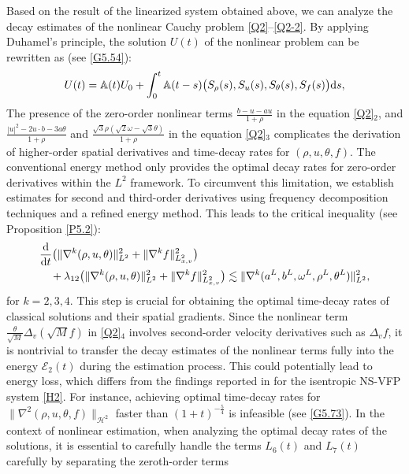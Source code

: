 \documentclass[reqno,11pt]{amsart}
\theoremstyle{plain}
\numberwithin{equation}{section}
\begin{document}
Based on the result of the linearized system obtained above, 
we can  analyze the decay estimates of the nonlinear Cauchy problem \eqref{Q2}--\eqref{Q2-2}. By applying  Duhamel's principle, the solution $U(t)$ of the nonlinear problem can be rewritten as (see \eqref{G5.54}):  
\begin{align*} 
U(t)=\mathbb{A}(t)U_{0}+\int_{0}^{t}\mathbb{A}(t-s)\big( S_\rho(s),S_u(s), S_\theta(s), S_f(s)\big) {\rm d}s,
\end{align*}    
The presence of the zero-order nonlinear terms $\frac{b-u-au}{1+\rho}$ in the equation \eqref{Q2}$_2$, and $\frac{|u|^2-2u\cdot b-3a\theta}{1+\rho}$ and $\frac{\sqrt{3}\rho(\sqrt{2}\omega-\sqrt{3}\theta)}{1+\rho}$ in the equation \eqref{Q2}$_3$ complicates the derivation of higher-order spatial derivatives and time-decay rates for $(\rho, u, \theta, f)$. 
The conventional energy method only provides the optimal decay rates for zero-order derivatives within the $L^2$ framework. To circumvent this limitation, we establish estimates for second and third-order derivatives using frequency decomposition techniques and a refined energy method. This leads to the critical inequality (see Proposition \ref{P5.2}):  
\begin{align}  
\label{LN-inequality}  
&\frac{{\rm d}}{{\rm d}t}\big( \|\nabla^k(\rho,u,\theta)\|_{L^2}^2 + \|\nabla^k f\|_{L_{x,v}^2}^2\big)\nonumber\\ &\quad + \lambda_{12}\big( \|\nabla^k(\rho,u,\theta)\|_{L^2}^2 + \|\nabla^k f\|_{L_{x,v}^2}^2\big) 
\lesssim \|\nabla^k(a^L,b^L,\omega^L,\rho^L,\theta^L)\|_{L^2}^2,  
\end{align}  
for $k=2,3,4$. This step is crucial for obtaining the optimal time-decay rates of classical solutions 
and their spatial gradients. Since the nonlinear term $\frac{\theta}{\sqrt{M}} \Delta_v(\sqrt{M} f)$
 in \eqref{Q2}$_4$ involves second-order velocity 
derivatives such as $\Delta_v f$, it is nontrivial to transfer the decay estimates of
 the nonlinear terms fully into the energy $\mathcal{E}_2(t)$ 
during the estimation process. This could potentially lead to energy loss, 
which differs from the findings reported in \cite{Ww-CMS-2024} for the isentropic NS-VFP system \eqref{H2}.
For instance, achieving optimal time-decay rates for $\|\nabla^2(\rho,u,\theta,f)\|_{\mathcal{H}^2}$ 
faster than $(1+t)^{-\frac{5}{4}}$ 
is infeasible (see \eqref{G5.73}). In the context of nonlinear estimation, 
when analyzing the optimal decay rates of the solutions, it is essential to  carefully handle  
the terms $L_6(t)$ and $L_7(t)$ carefully by separating the zeroth-order terms 
\end{document}
